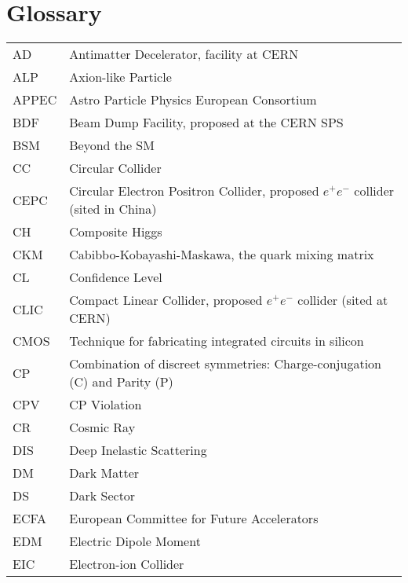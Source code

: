 

\appendix
\section{Glossary}
 \begin{tabular}{ll}
AD      &   Antimatter Decelerator, facility at CERN \\
ALP 	&	Axion-like Particle \\
APPEC   &   Astro Particle Physics European Consortium \\
BDF     &   Beam Dump Facility, proposed at the CERN SPS \\
BSM     &   Beyond the SM \\
CC      &   Circular Collider \\
CEPC    &   Circular Electron Positron Collider, proposed $e^+e^-$ collider (sited in China) \\
CH      &   Composite Higgs \\
CKM 	& 	Cabibbo-Kobayashi-Maskawa, the quark mixing matrix\\
CL      &   Confidence Level \\
CLIC    &   Compact Linear Collider, proposed $e^+e^-$ collider (sited at CERN) \\
CMOS    &   Technique for fabricating integrated circuits in silicon \\
CP      &   Combination of discreet symmetries: Charge-conjugation (C) and Parity (P) \\
CPV     &   CP Violation \\
CR      &   Cosmic Ray \\
DIS     &   Deep Inelastic Scattering \\
DM		&	Dark Matter \\
DS      &   Dark Sector \\
ECFA    &   European Committee for Future Accelerators \\
EDM	    & 	Electric Dipole Moment \\
EIC     &   Electron-ion Collider \\

\end{tabular}
